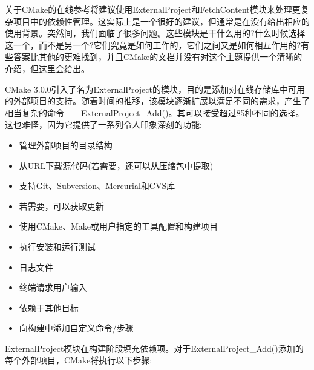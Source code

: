 
关于CMake的在线参考将建议使用ExternalProject和FetchContent模块来处理更复杂项目中的依赖性管理。这实际上是一个很好的建议，但通常是在没有给出相应的使用背景。突然间，我们面临了很多问题。这些模块是干什么用的?什么时候选择这一个，而不是另一个?它们究竟是如何工作的，它们之间又是如何相互作用的?有些答案比其他的更难找到，并且CMake的文档并没有对这个主题提供一个清晰的介绍，但这里会给出。


CMake 3.0.0引入了名为ExternalProject的模块，目的是添加对在线存储库中可用的外部项目的支持。随着时间的推移，该模块逐渐扩展以满足不同的需求，产生了相当复杂的命令——ExternalProject\_Add()。其可以接受超过85种不同的选择。这也难怪，因为它提供了一系列令人印象深刻的功能:

\begin{itemize}
\item 
管理外部项目的目录结构

\item 
从URL下载源代码(若需要，还可以从压缩包中提取)

\item 
支持Git、Subversion、Mercurial和CVS库

\item 
若需要，可以获取更新

\item 
使用CMake、Make或用户指定的工具配置和构建项目

\item 
执行安装和运行测试

\item 
日志文件

\item 
终端请求用户输入

\item 
依赖于其他目标

\item 
向构建中添加自定义命令/步骤
\end{itemize}

ExternalProject模块在构建阶段填充依赖项。对于ExternalProject\_Add()添加的每个外部项目，CMake将执行以下步骤:


